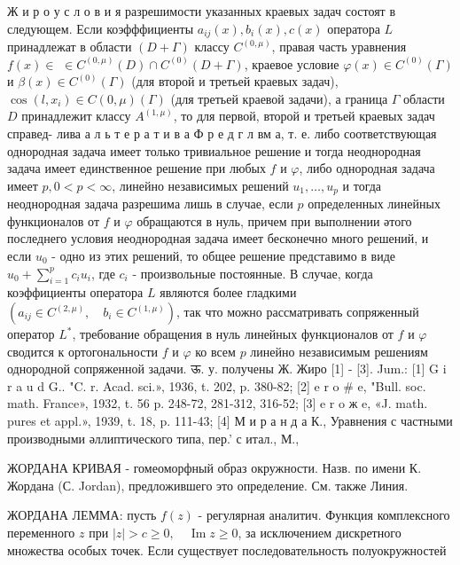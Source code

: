 \documentclass[10pt]{article}
\begin{document}
Ж и р о у с л о в и я разрешимости указанных краевых задач состоят в следующем. Если коэфффициенты $a_{i j}(x), b_{i}(x), c(x)$ оператора $L$ принадлежат в области $(D+\Gamma)$ классу $C^{(0, \mu)}$, правая часть уравнения $f(x) \in$ $\in C^{(0, \mu)}(D) \cap C^{(0)}(D+\Gamma)$, краевое условие $\varphi(x) \in C^{(0)}(\Gamma)$ и $\beta(x) \in C^{(0)}(\Gamma)$ (для второй и третьей краевых задач), $\cos \left(l, x_{i}\right) \in C(0, \mu)(\Gamma)$ (для третьей краевой задачи), а граница $\Gamma$ области $D$ принадлежит классу $A^{(1, \mu)}$, то для первой, второй и третьей краевых задач справед- лива а л ь т е р а т и в а Ф р е д г л вм а, т. е. либо соответствующая однородная задача имеет только тривиальное решение и тогда неоднородная задача имеет единственное решение при любых $f$ и $\varphi$, либо однородная задача имеет $p, 0<p<\infty$, линейно независимых решений $u_{1}, \ldots, u_{p}$ и тогда неоднородная задача разрешима лишь в случае, если $p$ определенных линейных функционалов от $f$ и $\varphi$ обращаются в нуль, причем при выполнении әтого последнего условия неоднородная задача имеет бесконечно много решений, и если $u_{0}$ - одно из этих решений, то общее решение представимо в виде $u_{0}+\sum_{i=1}^{p} c_{i} u_{i}$, где $c_{i}$ - произвольные постоянные. В случае, когда коэффициенты оператора $L$ являются более гладкими $\left(a_{i j} \in C^{(2, \mu)}, \quad b_{i} \in C^{(1, \mu)}\right)$, так что можно рассматривать сопряженный оператор $L^{*}$, требование обращения в нуль линейных функционалов от $f$ и $\varphi$ сводится к ортогональности $f$ и $\varphi$ ко всем $p$ линейно независимым решениям однородной сопряженной задачи. ऊ. у. получены Ж. Жиро [1] - [3]. Jum.: [1] G i r a u d G.. "C. r. Acad. sci.», 1936, t. 202, p. 380-82; [2] e r o \# e, "Bull. soc. math. France», 1932, t. 56 p. 248-72, 281-312, 316-52; [3] e r o ж e, «J. math. pures et appl.», 1939, t. 18, p. 111-43; [4] М и р а н д а К., Уравнения с частными производными әллиптического типа, пер.' с итал., М.,



ЖОРДАНА КРИВАЯ - гомеоморфный образ окружности. Назв. по имени К. Жордана (С. Jordan), предложившего это определение. См. также Линия.



ЖОРДАНА ЛЕММА: пусть $f(z)$ - регулярная аналитич. Функция комплексного переменного $z$ при $|z|>c \geqslant 0, \quad \operatorname{Im} z \geqslant 0$, за исключением дискретного множества особых точек. Если существует последовательность полуокружностей
\end{document}
